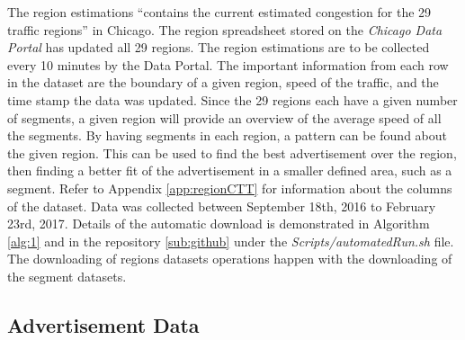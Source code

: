 \documentclass[titlepage,twocolumn]{article}
\begin{document}
\par The region estimations “contains the current estimated congestion for the 29 traffic regions” \cite{S3} in Chicago. The region spreadsheet stored on the \textit{Chicago Data Portal} has updated all 29 regions. The region estimations are to be collected every 10 minutes by the Data Portal. The important information from each row in the dataset are the boundary of a given region, speed of the traffic, and the time stamp the data was updated. Since the 29 regions each have a given number of segments, a given region will provide an overview of the average speed of all the segments. By having segments in each region, a pattern can be found about the given region. This can be used to find the best advertisement over the region, then finding a better fit of the advertisement in a smaller defined area, such as a segment. Refer to Appendix \ref{app:regionCTT} for information about the columns of the dataset. Data was collected between September 18th, 2016 to February 23rd, 2017. Details of the automatic download is demonstrated in Algorithm \ref{alg:1} and in the repository \ref{sub:github} under the \textit{Scripts/automatedRun.sh} file. The downloading of regions datasets operations happen with the downloading of the segment datasets.

\subsection{Advertisement Data}
\label{sub:adData}
\end{document}

